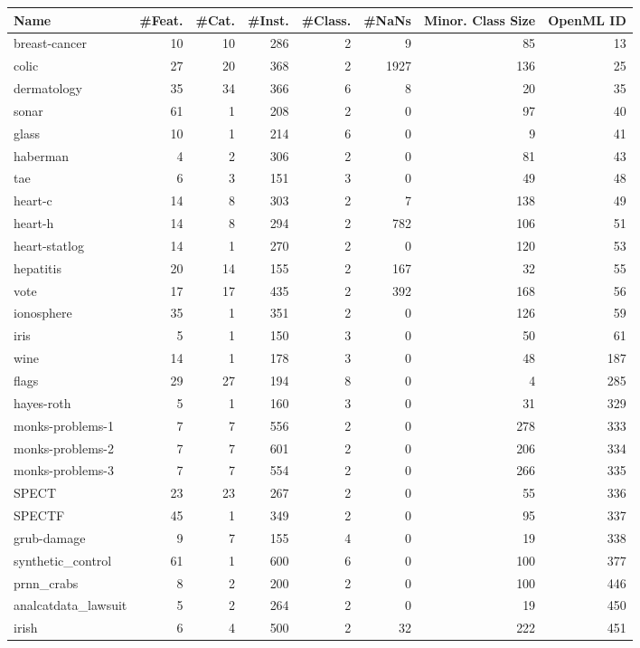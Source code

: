 \begin{tabular}{@{\hskip 0mm}l@{\hskip 0mm}rrrrrrr}
\toprule
 Name & \#Feat. &  \#Cat. &  \#Inst. &  \#Class. &  \#NaNs &  Minor. Class Size & OpenML ID \\
\midrule
 breast-cancer & 10 & 10 & 286 & 2 & 9 & 85 & 13 \\
 colic & 27 & 20 & 368 & 2 & 1927 & 136 & 25 \\
 dermatology & 35 & 34 & 366 & 6 & 8 & 20 & 35 \\
 sonar & 61 & 1 & 208 & 2 & 0 & 97 & 40 \\
 glass & 10 & 1 & 214 & 6 & 0 & 9 & 41 \\
 haberman & 4 & 2 & 306 & 2 & 0 & 81 & 43 \\
 tae & 6 & 3 & 151 & 3 & 0 & 49 & 48 \\
 heart-c & 14 & 8 & 303 & 2 & 7 & 138 & 49 \\
 heart-h & 14 & 8 & 294 & 2 & 782 & 106 & 51 \\
 heart-statlog & 14 & 1 & 270 & 2 & 0 & 120 & 53 \\
 hepatitis & 20 & 14 & 155 & 2 & 167 & 32 & 55 \\
 vote & 17 & 17 & 435 & 2 & 392 & 168 & 56 \\
 ionosphere & 35 & 1 & 351 & 2 & 0 & 126 & 59 \\
 iris & 5 & 1 & 150 & 3 & 0 & 50 & 61 \\
 wine & 14 & 1 & 178 & 3 & 0 & 48 & 187 \\
 flags & 29 & 27 & 194 & 8 & 0 & 4 & 285 \\
 hayes-roth & 5 & 1 & 160 & 3 & 0 & 31 & 329 \\
 monks-problems-1 & 7 & 7 & 556 & 2 & 0 & 278 & 333 \\
 monks-problems-2 & 7 & 7 & 601 & 2 & 0 & 206 & 334 \\
 monks-problems-3 & 7 & 7 & 554 & 2 & 0 & 266 & 335 \\
 SPECT & 23 & 23 & 267 & 2 & 0 & 55 & 336 \\
 SPECTF & 45 & 1 & 349 & 2 & 0 & 95 & 337 \\
 grub-damage & 9 & 7 & 155 & 4 & 0 & 19 & 338 \\
 synthetic\_control & 61 & 1 & 600 & 6 & 0 & 100 & 377 \\
 prnn\_crabs & 8 & 2 & 200 & 2 & 0 & 100 & 446 \\
 analcatdata\_lawsuit & 5 & 2 & 264 & 2 & 0 & 19 & 450 \\
 irish & 6 & 4 & 500 & 2 & 32 & 222 & 451 \\

\end{tabular}
